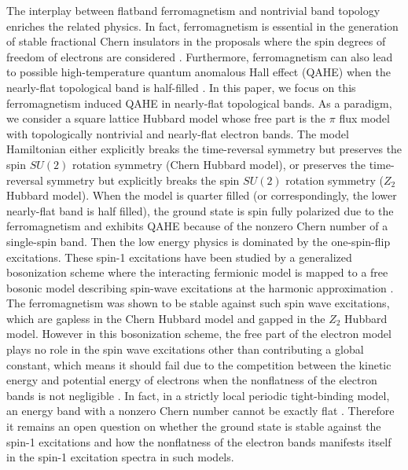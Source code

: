 \documentclass[amsmath,superscriptaddress,showpacs,aps,prb,twocolumn]{revtex4-1}
\begin{document}
\par The interplay between flatband ferromagnetism and nontrivial band topology enriches the related physics. In fact, ferromagnetism is essential in the generation of stable fractional Chern insulators in the proposals where the spin degrees of freedom of electrons are considered \cite{TMW_PRL2011,NSRCM_PRB2011,LBFL_PRL2012}. Furthermore, ferromagnetism can also lead to possible high-temperature quantum anomalous Hall effect (QAHE) when the nearly-flat topological band is half-filled \cite{NSRCM_PRL2012}. In this paper, we focus on this ferromagnetism induced QAHE in nearly-flat topological bands. As a paradigm, we consider a square lattice Hubbard model whose free part is the $\pi$ flux model with topologically nontrivial and nearly-flat electron bands. The model Hamiltonian either explicitly breaks the time-reversal symmetry but preserves the spin $SU(2)$ rotation symmetry (Chern Hubbard model), or preserves the time-reversal symmetry but explicitly breaks the spin $SU(2)$ rotation symmetry ($Z_2$ Hubbard model). When the model is quarter filled (or correspondingly, the lower nearly-flat band is half filled), the ground state is spin fully polarized due to the ferromagnetism and exhibits QAHE because of the nonzero Chern number of a single-spin band. Then the low energy physics is dominated by the one-spin-flip excitations. These spin-1 excitations have been studied by a generalized bosonization scheme where the interacting fermionic model is mapped to a free bosonic model describing spin-wave excitations at the harmonic approximation \cite{DG_PRB2015}. The ferromagnetism was shown to be stable against such spin wave excitations, which are gapless in the Chern Hubbard model and gapped in the $Z_2$ Hubbard model. However in this bosonization scheme, the free part of the electron model plays no role in the spin wave excitations other than contributing a global constant, which means it should fail due to the competition between the kinetic energy and potential energy of electrons when the nonflatness of the electron bands is not negligible \cite{T_PRL1994}. In fact, in a strictly local periodic tight-binding model, an energy band with a nonzero Chern number cannot be exactly flat \cite{CMST_JPMT2014}. Therefore it remains an open question on whether the ground state is stable against the spin-1 excitations and how the nonflatness of the electron bands manifests itself in the spin-1 excitation spectra in such models.
\end{document}

